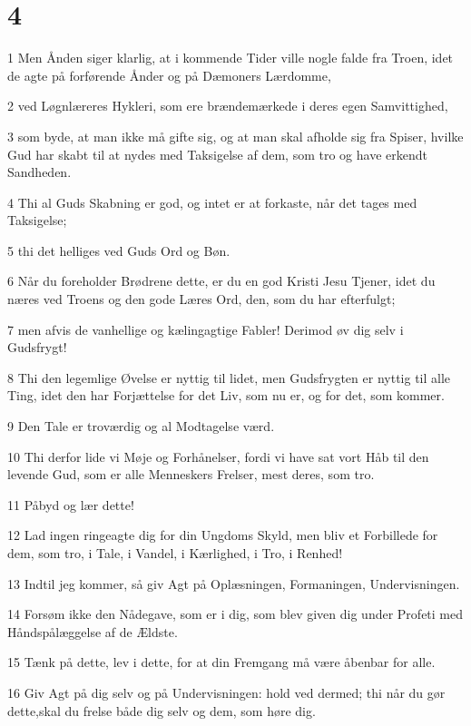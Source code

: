 \chapter{4}

\par 1 Men Ånden siger klarlig, at i kommende Tider ville nogle falde fra Troen, idet de agte på forførende Ånder og på Dæmoners Lærdomme,
\par 2 ved Løgnlæreres Hykleri, som ere brændemærkede i deres egen Samvittighed,
\par 3 som byde, at man ikke må gifte sig, og at man skal afholde sig fra Spiser, hvilke Gud har skabt til at nydes med Taksigelse af dem, som tro og have erkendt Sandheden.
\par 4 Thi al Guds Skabning er god, og intet er at forkaste, når det tages med Taksigelse;
\par 5 thi det helliges ved Guds Ord og Bøn.
\par 6 Når du foreholder Brødrene dette, er du en god Kristi Jesu Tjener, idet du næres ved Troens og den gode Læres Ord, den, som du har efterfulgt;
\par 7 men afvis de vanhellige og kælingagtige Fabler! Derimod øv dig selv i Gudsfrygt!
\par 8 Thi den legemlige Øvelse er nyttig til lidet, men Gudsfrygten er nyttig til alle Ting, idet den har Forjættelse for det Liv, som nu er, og for det, som kommer.
\par 9 Den Tale er troværdig og al Modtagelse værd.
\par 10 Thi derfor lide vi Møje og Forhånelser, fordi vi have sat vort Håb til den levende Gud, som er alle Menneskers Frelser, mest deres, som tro.
\par 11 Påbyd og lær dette!
\par 12 Lad ingen ringeagte dig for din Ungdoms Skyld, men bliv et Forbillede for dem, som tro, i Tale, i Vandel, i Kærlighed, i Tro, i Renhed!
\par 13 Indtil jeg kommer, så giv Agt på Oplæsningen, Formaningen, Undervisningen.
\par 14 Forsøm ikke den Nådegave, som er i dig, som blev given dig under Profeti med Håndspålæggelse af de Ældste.
\par 15 Tænk på dette, lev i dette, for at din Fremgang må være åbenbar for alle.
\par 16 Giv Agt på dig selv og på Undervisningen: hold ved dermed; thi når du gør dette,skal du frelse både dig selv og dem, som høre dig.

